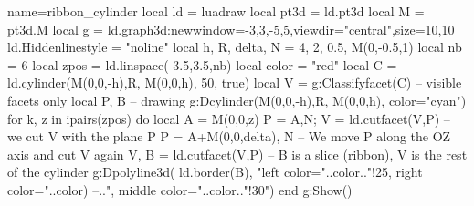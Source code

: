 \documentclass[12pt]{standalone} %
\begin{document}
\begin{luadraw}{name=ribbon_cylinder}
local ld = luadraw
local pt3d = ld.pt3d
local M = pt3d.M
local g = ld.graph3d:new{window={-3,3,-5,5},viewdir="central",size={10,10}}
ld.Hiddenlinestyle = "noline"
local h, R, delta, N = 4, 2, 0.5, M(0,-0.5,1) 
local nb = 6
local zpos = ld.linspace(-3.5,3.5,nb)
local color = "red"
local C = ld.cylinder(M(0,0,-h),R, M(0,0,h), 50, true)
local V = g:Classifyfacet(C) -- visible facets only
local P, B
-- drawing
g:Dcylinder(M(0,0,-h),R, M(0,0,h), {color="cyan"})
for k, z in ipairs(zpos) do
    local A = M(0,0,z)
    P = {A,N}; V = ld.cutfacet(V,P) -- we cut V with the plane P
    P = {A+M(0,0,delta), N} -- We move P along the OZ axis and cut V again
    V, B = ld.cutfacet(V,P) -- B is a slice (ribbon), V is the rest of the cylinder
    g:Dpolyline3d( ld.border(B),
        "left color="..color.."!25, right color="..color) --..", middle color="..color.."!30")
end
g:Show()
\end{luadraw}
\end{document}
